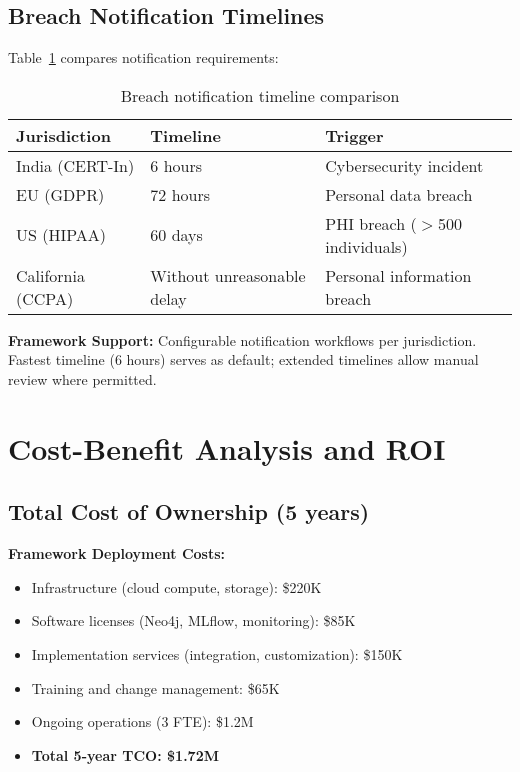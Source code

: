 \subsection{Breach Notification Timelines}
Table~\ref{tab:breach-timelines} compares notification requirements:

\begin{table}[H]
\centering
\caption{Breach notification timeline comparison}
\label{tab:breach-timelines}
\begin{tabular}{lll}
\toprule
\textbf{Jurisdiction} & \textbf{Timeline} & \textbf{Trigger} \\
\midrule
India (CERT-In) & 6 hours & Cybersecurity incident \\
EU (GDPR) & 72 hours & Personal data breach \\
US (HIPAA) & 60 days & PHI breach ($>$500 individuals) \\
California (CCPA) & Without unreasonable delay & Personal information breach \\
\bottomrule
\end{tabular}
\end{table}

\textbf{Framework Support:} Configurable notification workflows per jurisdiction. Fastest timeline (6 hours) serves as default; extended timelines allow manual review where permitted.

\section{Cost-Benefit Analysis and ROI}\label{sec:policy-costbenefit}
\subsection{Total Cost of Ownership (5 years)}
\textbf{Framework Deployment Costs:}
\begin{itemize}
    \item Infrastructure (cloud compute, storage): \$220K
    \item Software licenses (Neo4j, MLflow, monitoring): \$85K
    \item Implementation services (integration, customization): \$150K
    \item Training and change management: \$65K
    \item Ongoing operations (3 FTE): \$1.2M
    \item \textbf{Total 5-year TCO: \$1.72M}
\end{itemize}


